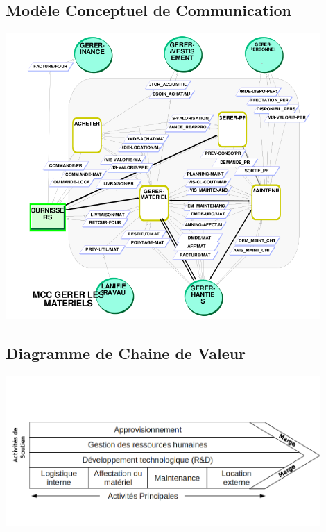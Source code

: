     \subsection{Modèle Conceptuel de Communication}
        \includegraphics[width=0.9\textwidth]{img/MCC.png}

    \subsection{Diagramme de Chaine de Valeur}
        \includegraphics[width=0.9\textwidth]{img/CdV.png}

